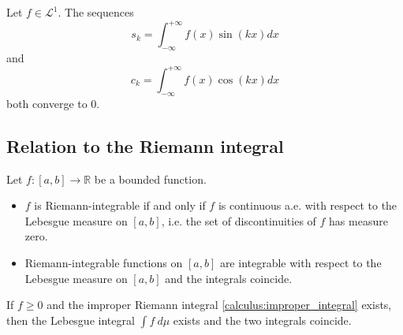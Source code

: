     \begin{theorem}\label{lebesgue:riemann_lebesue_lemma}
        Let $f\in\mathcal{L}^1$. The sequences \[s_k = \int_{-\infty}^{+\infty}f(x)\sin(kx)dx\] and \[c_k = \int_{-\infty}^{+\infty}f(x)\cos(kx)dx\] both converge to 0.
    \end{theorem}

\subsection{Relation to the Riemann integral}

    \begin{property}
        Let $f:[a,b]\rightarrow\mathbb{R}$ be a bounded function.
        \begin{itemize}
            \item $f$ is Riemann-integrable if and only if $f$ is continuous a.e. with respect to the Lebesgue measure on $[a,b]$, i.e. the set of discontinuities of $f$ has measure zero.
            \item Riemann-integrable functions on $[a,b]$ are integrable with respect to the Lebesgue measure on $[a,b]$ and the integrals coincide.
        \end{itemize}
    \end{property}

    \begin{property}
        If $f\geq0$ and the improper Riemann integral \ref{calculus:improper_integral} exists, then the Lebesgue integral $\int f\ d\mu$ exists and the two integrals coincide.
    \end{property}